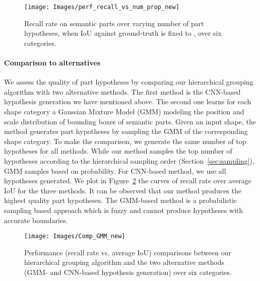 \documentclass[acmtog]{acmart}
\newcommand{\wxg}[1]{{\color{black}#1}}
\begin{document}
\begin{figure}[!t]
  \centering
  \texttt{[image: Images/perf\_recall\_vs\_num\_prop\_new]}
  \caption{Recall rate on semantic parts over varying number of part hypotheses, when IoU against ground-truth is fixed to , over six categories.}
  \label{fig:Perf_recall_vs_num}
\end{figure}

\paragraph{\textbf{Comparison to alternatives}}
We assess the quality of part hypotheses
by comparing our hierarchical grouping algorithm with two alternative methods.
The first method is the CNN-based hypothesis generation we have mentioned above.
The second one learns for each shape category
a Gaussian Mixture Model (GMM) modeling the position and scale distribution
of bounding boxes of semantic parts.
Given an input shape, the method generates part hypotheses
by sampling the GMM of the corresponding shape category.
To make the comparison, we generate the same number of top hypotheses for all methods.
While our method samples the top number of hypotheses according to the hierarchical sampling order
(Section~\ref{sec:sampling}), GMM samples based on probability.
For CNN-based method, we use all hypotheses generated.
We plot in Figure~\ref{fig:Comp_GMM_2} the curves of recall rate over average IoU for the three methods.
It can be observed that our method produces the highest quality part hypotheses.
The GMM-based method is a probabilistic sampling based approach which is fuzzy and cannot produce hypotheses with accurate boundaries.


\begin{figure}[!t]
  \centering
  \texttt{[image: Images/Comp\_GMM\_new]}
  \caption{\wxg{Performance (recall rate vs. average IoU) comparisons between our hierarchical grouping algorithm and the two alternative methods (GMM- and CNN-based hypothesis generation) over six categories.}}
  \label{fig:Comp_GMM_2}
\end{figure}
\end{document}
